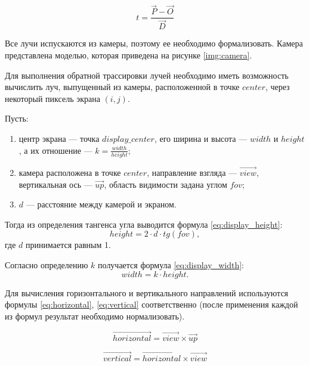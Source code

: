 \begin{equation}\label{eq:ray_t}
	t = \frac{\overrightarrow{P} - \overrightarrow{O}}{\overrightarrow{D}}
\end{equation}

Все лучи испускаются из камеры, поэтому ее необходимо формализовать.
Камера представлена моделью, которая приведена на рисунке \ref{img:camera}.


Для выполнения обратной трассировки лучей необходимо иметь возможность вычислить луч, выпущенный из камеры, расположенной в точке $center$, через некоторый пиксель экрана $(i, j)$.

Пусть:
\begin{enumerate}
	\item центр экрана --- точка $display\_center$, его ширина и высота --- $width$ и $height$, а их отношение --- $k = \frac{width}{height}$;
	\item камера расположена в точке $center$, направление взгляда --- $\overrightarrow{view}$, вертикальная ось --- $\overrightarrow{up}$, область видимости задана углом $fov$;
	\item $d$ --- расстояние между камерой и экраном.
\end{enumerate}

Тогда из определения тангенса угла выводится формула \ref{eq:display_height}:
\begin{equation}\label{eq:display_height}
	height = 2 \cdot d \cdot tg(fov),
\end{equation}
где $d$ принимается равным 1.

Согласно определению $k$ получается формула \ref{eq:display_width}:
\begin{equation}\label{eq:display_width}
	width = k \cdot height.
\end{equation}

Для вычисления горизонтального и вертикального направлений используются формулы \ref{eq:horizontal}, \ref{eq:vertical} соответственно (после применения каждой из формул результат необходимо нормализовать).

\begin{equation}\label{eq:horizontal}
	\overrightarrow{horizontal} = \overrightarrow{view} \times \overrightarrow{up}
\end{equation}

\begin{equation}\label{eq:vertical}
	\overrightarrow{vertical} = \overrightarrow{horizontal} \times \overrightarrow{view}
\end{equation}

